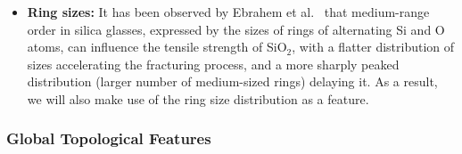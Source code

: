 \begin{itemize}
    
    
    \item\textbf{Ring sizes:} It has been observed by Ebrahem et al.~\cite{ebrahem2018influence} that medium-range order in silica glasses, expressed by the sizes of rings of alternating Si and O atoms, can influence the tensile strength of SiO$_2$, with a flatter distribution of sizes accelerating the fracturing process, and a more sharply peaked distribution (larger number of medium-sized rings) delaying it. As a result, we will also make use of the ring size distribution as a feature.     
    
    
\end{itemize}

\subsubsection{Global Topological Features}

